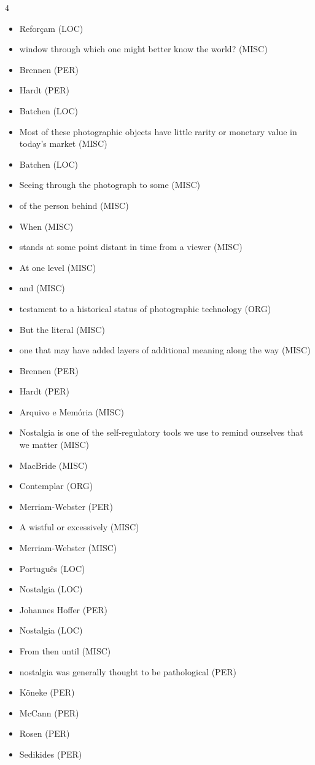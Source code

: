 \documentclass{article}
\begin{document}
\begin{multicols}{4}
\begin{itemize}
Harot (PER)
\item Reforçam (LOC)
\item window through which one might better know the world? (MISC)
\item Brennen (PER)
\item Hardt (PER)
\item Batchen (LOC)
\item Most  of  these 
photographic objects have little rarity or monetary value in today’s market (MISC)
\item Batchen (LOC)
\item Seeing through the photograph to some (MISC)
\item of the person behind (MISC)
\item When (MISC)
\item stands at some point distant in time from a viewer (MISC)
\item At one level (MISC)
\item and (MISC)
\item testament 
to a historical status of photographic technology (ORG)
\item But the literal (MISC)
\item one that may have added layers of additional meaning along the 
way (MISC)
\item Brennen (PER)
\item Hardt (PER)
\item Arquivo e Memória (MISC)
\item Nostalgia is one of the self-regulatory tools we use to remind ourselves that we 
matter (MISC)
\item MacBride (MISC)
\item Contemplar (ORG)
\item Merriam-Webster (PER)
\item A wistful or excessively (MISC)
\item Merriam-Webster (MISC)
\item Português (LOC)
\item Nostalgia (LOC)
\item Johannes Hoffer (PER)
\item Nostalgia (LOC)
\item From then until (MISC)
\item nostalgia was 
generally thought to be pathological (PER)
\item Köneke (PER)
\item McCann (PER)
\item Rosen (PER)
\item Sedikides (PER)

\end{itemize}
\end{multicols}
\end{document}
